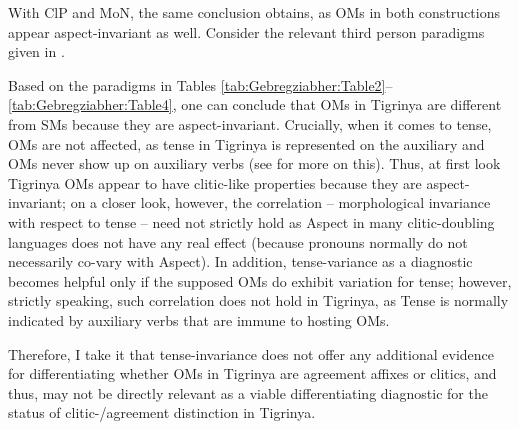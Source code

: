 \documentclass[output=paper]{langscibook}
\begin{document}
With ClP and MoN, the same conclusion obtains, as OMs in both constructions appear aspect-invariant as well. Consider the relevant third person paradigms given in . 

\begin{table}
\caption{Aspectual distinction of Tigrinya OMs in clausal possession \& modal necessity\label{tab:Gebregziabher:Table4}}
\end{table}

Based on the paradigms in Tables \ref{tab:Gebregziabher:Table2}--\ref{tab:Gebregziabher:Table4}, one can conclude that OMs in Tigrinya are different from SMs because they are aspect-invariant. Crucially, when it comes to tense, OMs are not affected, as tense in Tigrinya is represented on the auxiliary and OMs never show up on auxiliary verbs (see  for more on this). Thus, at first look Tigrinya OMs appear to have clitic-like properties because they are aspect-invariant; on a closer look, however, the correlation -- morphological invariance with respect to tense -- need not strictly hold as Aspect in many clitic-doubling languages does not have any real effect (because pronouns normally do not necessarily co-vary with Aspect). In addition, tense-variance as a diagnostic becomes helpful only if the supposed OMs do exhibit variation for tense; however, strictly speaking, such correlation does not hold in Tigrinya, as Tense is normally indicated by auxiliary verbs that are immune to hosting OMs.

Therefore, I take it that tense-invariance does not offer any additional evidence for differentiating whether OMs in Tigrinya are agreement affixes or clitics, and thus, may not be directly relevant as a viable differentiating diagnostic for the status of clitic-/agreement distinction in Tigrinya.
\end{document}
